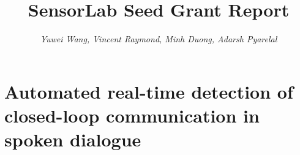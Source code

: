 \documentclass[oneside,9pt]{memoir}
\title{SensorLab Seed Grant Report}
\author{\emph{Yuwei Wang, Vincent Raymond, Minh Duong, Adarsh Pyarelal}}
\begin{document}
\thispagestyle{empty}
\maketitle
\tableofcontents* 


\chapter{Automated real-time detection of closed-loop communication in spoken dialogue}




\printbibliography
\end{document}
